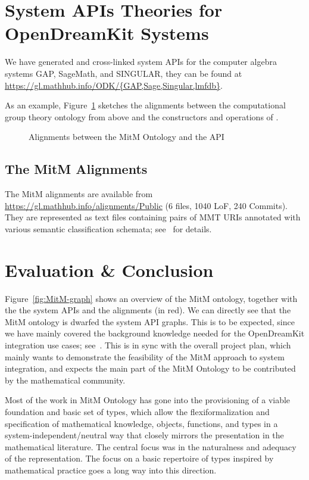 \documentclass[book]{deliverablereport}
\begin{document}
\section{System APIs Theories for OpenDreamKit Systems}

We have generated and cross-linked system APIs for the computer algebra systems GAP,
SageMath, and SINGULAR, they can be found at
\url{https://gl.mathhub.info/ODK/{GAP,Sage,Singular,lmfdb}}.

As an example, Figure~\ref{fig:cgtontology} sketches the alignments between the
computational group theory ontology from above and the constructors and operations of
\GAP.

\begin{figure}[ht]\centering
  \caption{Alignments between the MitM Ontology and the \GAP API}\label{fig:cgtontology}
\end{figure}

\subsection{The MitM Alignments}

The MitM alignments are available from \url{https://gl.mathhub.info/alignments/Public} (6
files, 1040 LoF, 240 Commits). They are represented as text files containing pairs of MMT
URIs annotated with various semantic classification schemata;
see~\cite{MueGauKal:cacfms17} for details.

\section{Evaluation \& Conclusion}\label{sec:concl}
Figure~\ref{fig:MitM-graph} shows an overview of the MitM ontology, together with the the
system APIs and the alignments (in red). We can directly see that the MitM ontology is
dwarfed the system API graphs. This is to be expected, since we have mainly covered the
background knowledge needed for the OpenDreamKit integration use cases;
see~\cite{ODK-D6.5}. This is in sync with the overall project plan, which mainly wants to
demonstrate the feasibility of the MitM approach to system integration, and expects the
main part of the MitM Ontology to be contributed by the mathematical community.

Most of the work in MitM Ontology has gone into the provisioning of a viable foundation
and basic set of types, which allow the flexiformalization and specification of
mathematical knowledge, objects, functions, and types in a system-independent/neutral way
that closely mirrors the presentation in the mathematical literature. The central focus
was in the naturalness and adequacy of the representation. The focus on a basic repertoire
of types inspired by mathematical practice goes a long way into this direction.
\end{document}

